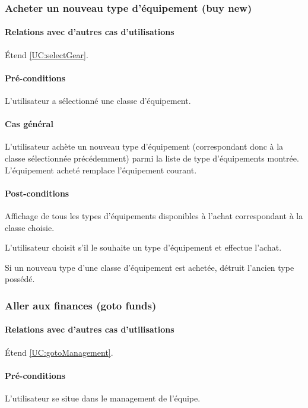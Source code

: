 \subsubsection{Acheter un nouveau type d'équipement (buy new)}
\label{UC:buyGear}
\paragraph{Relations avec d'autres cas d'utilisations}
Étend \ref{UC:selectGear}.
\paragraph{Pré-conditions}
\begin{list}{}{\leftmargin=1.5em}
\item{L'utilisateur a sélectionné une classe d'équipement.}
\end{list}
\paragraph{Cas général}
L'utilisateur achète un nouveau type d'équipement (correspondant donc à la classe sélectionnée précédemment) parmi la liste de type d'équipements montrée. L'équipement acheté remplace l'équipement courant. 
\paragraph{Post-conditions}
\begin{list}{}{\leftmargin=1.5em}
\item{Affichage de tous les types d'équipements disponibles à l'achat correspondant à la classe choisie.}
\item{L'utilisateur choisit s'il le souhaite un type d'équipement et effectue l'achat.}
\item{Si un nouveau type d'une classe d'équipement est achetée, détruit l'ancien type possédé.}
\end{list}

\subsubsection{Aller aux finances (goto funds)}
\label{UC:gotoFunds}
\paragraph{Relations avec d'autres cas d'utilisations}
Étend \ref{UC:gotoManagement}.
\paragraph{Pré-conditions}
\begin{list}{}{\leftmargin=1.5em}
\item{L'utilisateur se situe dans le management de l'équipe.}
\end{list}
